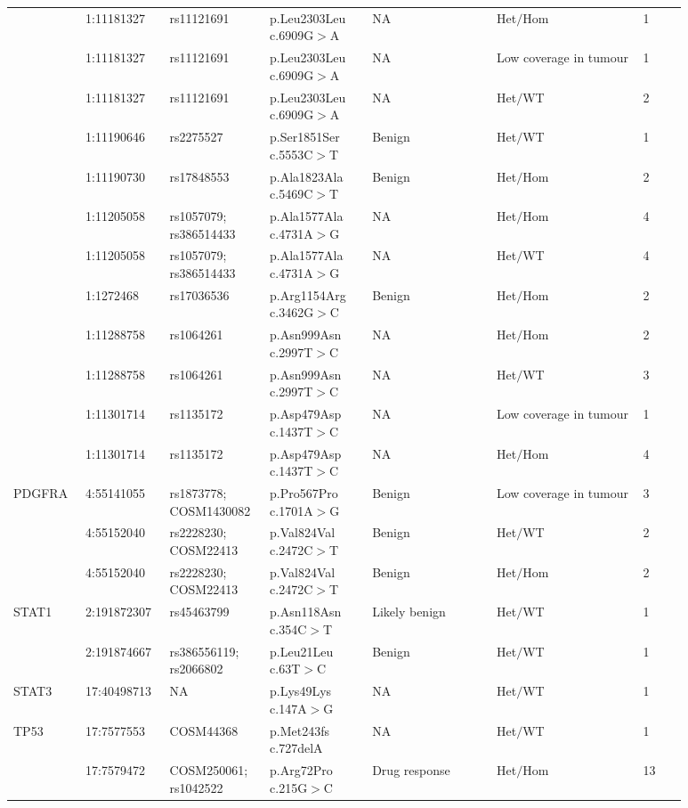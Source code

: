 \begin{landscape}
\begin{longtable}{p{0.09\linewidth}|p{0.1\linewidth}p{0.12\linewidth}p{0.14\linewidth}p{0.17\linewidth}p{0.2\linewidth}p{0.06\linewidth}}
		& 1:11181327 & rs11121691 & p.Leu2303Leu c.6909G$>$A & NA & Het$/$Hom & 1
		\\
		& 1:11181327 & rs11121691 & p.Leu2303Leu c.6909G$>$A & NA & Low coverage in tumour & 1
		\\
		& 1:11181327 & rs11121691 & p.Leu2303Leu c.6909G$>$A & NA & Het$/$WT & 2
		\\
		& 1:11190646 & rs2275527 & p.Ser1851Ser c.5553C$>$T & Benign & Het$/$WT & 1
		\\
		& 1:11190730 & rs17848553 & p.Ala1823Ala c.5469C$>$T & Benign & Het$/$Hom & 2
		\\
		& 1:11205058 & rs1057079; rs386514433 & p.Ala1577Ala c.4731A$>$G & NA & Het$/$Hom & 4
		\\
		& 1:11205058 & rs1057079; rs386514433 & p.Ala1577Ala c.4731A$>$G & NA & Het$/$WT & 4
		\\
		& 1:1272468 & rs17036536 & p.Arg1154Arg c.3462G$>$C & Benign & Het$/$Hom & 2
		\\
		& 1:11288758 & rs1064261 & p.Asn999Asn c.2997T$>$C & NA & Het$/$Hom & 2
		\\
		& 1:11288758 & rs1064261 & p.Asn999Asn c.2997T$>$C & NA & Het$/$WT & 3
		\\
		& 1:11301714 & rs1135172 & p.Asp479Asp c.1437T$>$C & NA & Low coverage in tumour & 1
		\\
		& 1:11301714 & rs1135172 & p.Asp479Asp c.1437T$>$C & NA & Het$/$Hom & 4
		\\
		\hline
		PDGFRA & 4:55141055 & rs1873778; COSM1430082 & p.Pro567Pro c.1701A$>$G & Benign & Low coverage in tumour & 3
		\\
		& 4:55152040 & rs2228230; COSM22413 & p.Val824Val c.2472C$>$T & Benign & Het$/$WT & 2
		\\
		& 4:55152040 & rs2228230; COSM22413 & p.Val824Val c.2472C$>$T & Benign & Het$/$Hom & 2
		\\
		\hline
		STAT1 & 2:191872307 & rs45463799 & p.Asn118Asn c.354C$>$T & Likely benign & Het$/$WT & 1
		\\
		& 2:191874667 & rs386556119; rs2066802 & p.Leu21Leu c.63T$>$C & Benign & Het$/$WT & 1
		\\
		\hline
		STAT3 & 17:40498713 & NA & p.Lys49Lys c.147A$>$G & NA & Het$/$WT & 1
		\\
		\hline
		TP53 & 17:7577553 & COSM44368 & p.Met243fs c.727delA & NA & Het$/$WT & 1
		\\
		& 17:7579472 & COSM250061; rs1042522 & p.Arg72Pro c.215G$>$C & Drug response & Het$/$Hom & 13
		\\

\end{longtable}
\end{landscape}

